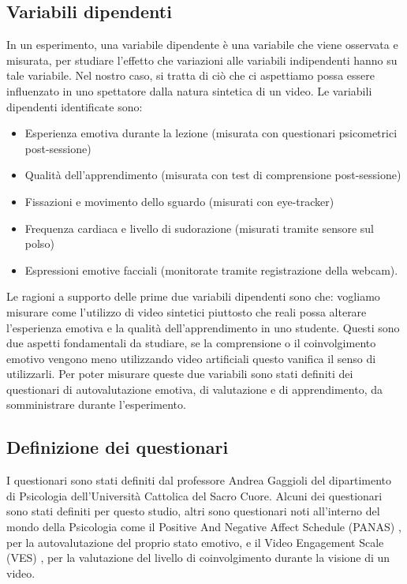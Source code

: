 \subsection{Variabili dipendenti}

In un esperimento, una variabile dipendente è una variabile che viene osservata e misurata, per studiare l'effetto che variazioni alle variabili indipendenti hanno su tale variabile. Nel nostro caso, si tratta di ciò che ci aspettiamo possa essere influenzato in uno spettatore dalla natura sintetica di un video. Le variabili dipendenti identificate sono:

\begin{itemize}
    \item Esperienza emotiva durante la lezione (misurata con questionari psicometrici post-sessione)
    \item Qualità dell’apprendimento (misurata con test di comprensione post-sessione)
    \item Fissazioni e movimento dello sguardo (misurati con eye-tracker)
    \item Frequenza cardiaca e livello di sudorazione (misurati tramite sensore sul polso)
    \item Espressioni emotive facciali (monitorate tramite registrazione della webcam).
\end{itemize}

Le ragioni a supporto delle prime due variabili dipendenti sono che: vogliamo misurare come l'utilizzo di video sintetici piuttosto che reali possa alterare l'esperienza emotiva e la qualità dell'apprendimento in uno studente. Questi sono due aspetti fondamentali da studiare, se la comprensione o il coinvolgimento emotivo vengono meno utilizzando video artificiali questo vanifica il senso di utilizzarli. Per poter misurare queste due variabili sono stati definiti dei questionari di autovalutazione emotiva, di valutazione e di apprendimento, da somministrare durante l'esperimento.

\subsection{Definizione dei questionari}

I questionari sono stati definiti dal professore Andrea Gaggioli del dipartimento di Psicologia dell'Università Cattolica del Sacro Cuore. Alcuni dei questionari sono stati definiti per questo studio, altri sono questionari noti all'interno del mondo della Psicologia come il Positive And Negative Affect Schedule (PANAS) \cite{crawford2004panas}, per la autovalutazione del proprio stato emotivo, e il Video Engagement Scale (VES) \cite{visser2016ves}, per la valutazione del livello di coinvolgimento durante la visione di un video.

